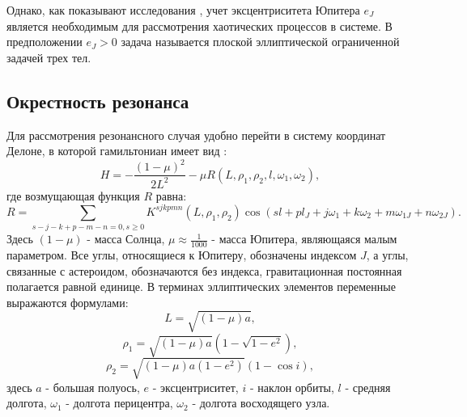 Однако, как показывают исследования \cite{fejoz, kaloshin}, учет эксцентриситета Юпитера $e_J$ является необходимым для рассмотрения хаотических процессов в системе. В предположении $e_{J}>0$ задача называется плоской эллиптической ограниченной задачей трех тел.



















































\subsection{Окрестность резонанса}
Для рассмотрения резонансного случая удобно перейти в систему координат Делоне, в которой гамильтониан имеет вид \cite{plummer}:
$$H = - \frac{(1-\mu)^2}{2L^2} - \mu R(L, \rho_1, \rho_2, l, \omega_1, \omega_2),$$
где возмущающая функция $R$ равна:
$$R = \sum_{s-j-k+p-m-n=0, s \geq 0} K^{sjkpmn}(L, \rho_1, \rho_2) \cos(s l + p l_J + j \omega_1 + k \omega_2 + m \omega_{1J} + n \omega_{2J}).$$
Здесь $(1-\mu)$ - масса Солнца, $\mu \approx \frac{1}{1000}$ - масса Юпитера, являющаяся малым параметром. Все углы, относящиеся к Юпитеру, обозначены индексом $J$, а углы, связанные с астероидом, обозначаются без индекса, гравитационная постоянная полагается равной единице. В терминах эллиптических элементов переменные выражаются формулами:
$$L = \sqrt{(1-\mu)a},$$
$$\rho_1 = \sqrt{(1-\mu)a}(1-\sqrt{1-e^2}),$$
$$\rho_2 = \sqrt{(1-\mu)a(1-e^2)}(1-\cos i),$$
здесь $a$ - большая полуось, $e$ - эксцентриситет, $i$ - наклон орбиты, $l$ - средняя долгота, $\omega_1$ - долгота перицентра, $\omega_2$ - долгота восходящего узла.

